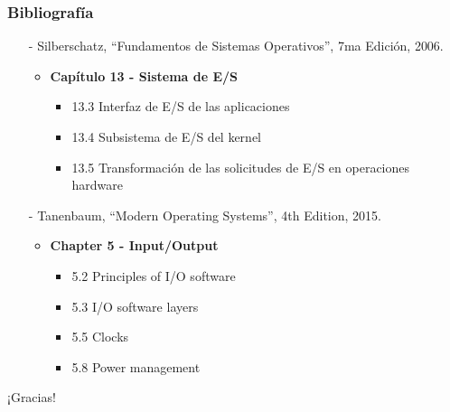 \documentclass[aspectratio=169]{beamer}
\begin{document}
\begin{frame}[fragile]
    \frametitle{Bibliografía}
    \begin{itemize}
        \setlength\itemsep{0.5cm}
        \item[-] \small Silberschatz, ``Fundamentos de Sistemas Operativos'', 7ma Edición, 2006.\\
        \begin{itemize}
            \item \textbf{Capítulo 13 - Sistema de E/S}
            \begin{itemize}
                \item 13.3 Interfaz de E/S de las aplicaciones
                \item 13.4 Subsistema de E/S del kernel
                \item 13.5 Transformación de las solicitudes de E/S en operaciones hardware
            \end{itemize}
        \end{itemize}
        \item[-] \small Tanenbaum, ``Modern Operating Systems'', 4th Edition, 2015.\\
        \begin{itemize}
            \item \textbf{Chapter 5 - Input/Output}
            \begin{itemize}
                \item 5.2 Principles of I/O software
                \item 5.3 I/O software layers
                \item 5.5 Clocks
                \item 5.8 Power management
            \end{itemize}
        \end{itemize}
    \end{itemize}
\end{frame}

\begin{frame}[plain]
    \begin{center}
    \vspace{2cm}
    \huge ¡Gracias!\\
    \vspace{2cm}
    \end{center}
\end{frame}
\end{document}
